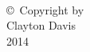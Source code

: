 
\thispagestyle{empty}
\hbox{\ }

\vfill
\renewcommand{\baselinestretch}{1}
\small\normalsize

\vspace{-.65in}

\begin{center}
\large{\copyright \hbox{ }Copyright by\\
Clayton Davis  %
\\
2014}
\end{center}

\vfill
